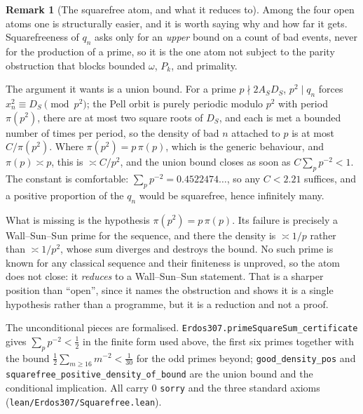 \documentclass[11pt]{article}
\theoremstyle{definition}
\newtheorem{remark}[theorem]{Remark}
\begin{document}
\begin{remark}[The squarefree atom, and what it reduces to]\label{rem:squarefree}
Among the four open atoms one is structurally easier, and it is worth saying why and how far it
gets. Squarefreeness of $q_n$ asks only for an \emph{upper} bound on a count of bad events, never
for the production of a prime, so it is the one atom not subject to the parity obstruction that
blocks bounded $\omega$, $P_k$, and primality.

The argument it wants is a union bound. For a prime $p\nmid2A_SD_S$, $p^2\mid q_n$ forces
$x_n^2\equiv D_S\pmod{p^2}$; the Pell orbit is purely periodic modulo $p^2$ with period
$\pi(p^2)$, there are at most two square roots of $D_S$, and each is met a bounded number of times
per period, so the density of bad $n$ attached to $p$ is at most $C/\pi(p^2)$. Where
$\pi(p^2)=p\,\pi(p)$, which is the generic behaviour, and $\pi(p)\asymp p$, this is $\asymp C/p^2$,
and the union bound closes as soon as $C\sum_pp^{-2}<1$. The constant is comfortable:
$\sum_pp^{-2}=0.4522474\ldots$, so any $C<2.21$ suffices, and a positive proportion of the $q_n$
would be squarefree, hence infinitely many.

What is missing is the hypothesis $\pi(p^2)=p\,\pi(p)$. Its failure is precisely a
Wall--Sun--Sun prime for the sequence, and there the density is $\asymp1/p$ rather than
$\asymp1/p^2$, whose sum diverges and destroys the bound. No such prime is known for any classical
sequence and their finiteness is unproved, so the atom does not close: it \emph{reduces} to a
Wall--Sun--Sun statement. That is a sharper position than ``open'', since it names the obstruction
and shows it is a single hypothesis rather than a programme, but it is a reduction and not a proof.

The unconditional pieces are formalised. \texttt{Erdos307.primeSquareSum\_certificate} gives
$\sum_pp^{-2}<\tfrac12$ in the finite form used above, the first six primes together with the bound
$\tfrac12\sum_{m\ge16}m^{-2}<\tfrac1{30}$ for the odd primes beyond; \texttt{good\_density\_pos} and
\texttt{squarefree\_positive\_density\_of\_bound} are the union bound and the conditional
implication. All carry $0$ \texttt{sorry} and the three standard axioms
\textup{(\texttt{lean/Erdos307/Squarefree.lean})}.


\end{remark}
\end{document}
